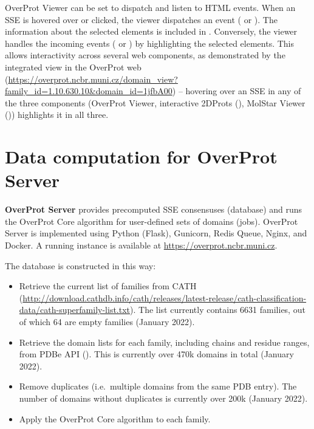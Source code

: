\documentclass{article}
\begin{document}
OverProt Viewer can be set to dispatch and listen to HTML events. 
When an SSE is hovered over or clicked, the viewer dispatches an event 
( or ). 
The information about the selected elements is included in .
Conversely, the viewer handles the incoming events ( 
or ) by highlighting the selected elements. 
This allows interactivity across several web components, as demonstrated by 
the integrated view in the OverProt web 
(\url{https://overprot.ncbr.muni.cz/domain_view?family_id=1.10.630.10&domain_id=1jfbA00})
-- hovering over an SSE in any of the three components (OverProt Viewer, 
interactive 2DProts (), 
MolStar Viewer ()) highlights it in all three.



\section{Data computation for OverProt Server}

\textbf{OverProt Server} provides precomputed SSE consensuses (database)
and runs the OverProt Core algorithm for user-defined sets of domains (jobs). 
OverProt Server is implemented using Python (Flask), Gunicorn, Redis Queue, Nginx, and Docker.
A running instance is available at \url{https://overprot.ncbr.muni.cz}.

The database is constructed in this way:

\begin{itemize}
\item
  Retrieve the current list of families from CATH
  (\url{http://download.cathdb.info/cath/releases/latest-release/cath-classification-data/cath-superfamily-list.txt}).
  The list currently contains 6631 families, out of which 64 are empty
  families (January 2022).
\item
  Retrieve the domain lists for each family, including chains and
  residue ranges, from PDBe API
  (). This is
  currently over 470k domains in total (January 2022).
\item
  Remove duplicates (i.e.~multiple domains from the same PDB entry).
  The number of domains without duplicates is currently over 200k (January 2022).
\item
  Apply the OverProt Core algorithm to each family.
\end{itemize}
\end{document}
